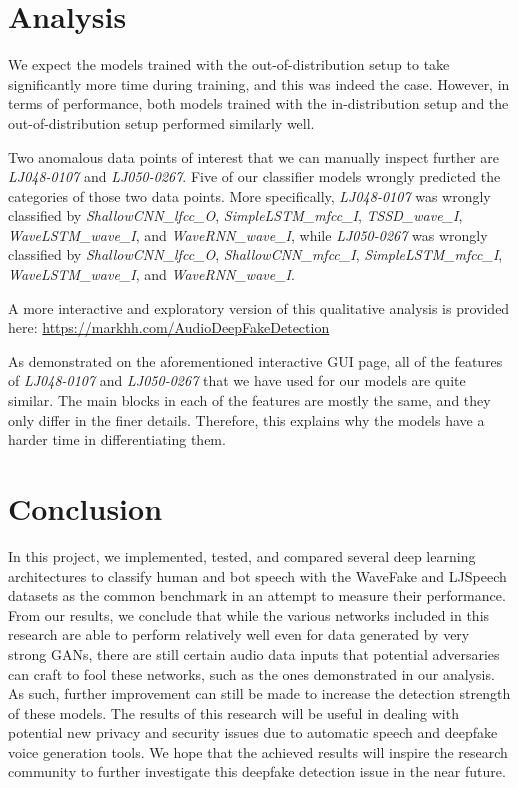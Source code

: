 \documentclass{article}
\begin{document}

\section{Analysis}
We expect the models trained with the out-of-distribution setup to take significantly more time during training, and this was indeed the case. However, in terms of performance, both models trained with the in-distribution setup and the out-of-distribution setup performed similarly well.

Two anomalous data points of interest that we can manually inspect further are \emph{LJ048-0107} and \emph{LJ050-0267}. Five of our classifier models wrongly predicted the categories of those two data points. More specifically, \emph{LJ048-0107} was wrongly classified by \emph{ShallowCNN\_lfcc\_O}, \emph{SimpleLSTM\_mfcc\_I}, \emph{TSSD\_wave\_I}, \emph{WaveLSTM\_wave\_I}, and \emph{WaveRNN\_wave\_I}, while \emph{LJ050-0267} was wrongly classified by \emph{ShallowCNN\_lfcc\_O}, \emph{ShallowCNN\_mfcc\_I}, \emph{SimpleLSTM\_mfcc\_I}, \emph{WaveLSTM\_wave\_I}, and \emph{WaveRNN\_wave\_I}.

A more interactive and exploratory version of this qualitative analysis is provided here: \url{https://markhh.com/AudioDeepFakeDetection}

As demonstrated on the aforementioned interactive GUI page, all of the features of \emph{LJ048-0107} and \emph{LJ050-0267} that we have used for our models are quite similar. The main blocks in each of the features are mostly the same, and they only differ in the finer details. Therefore, this explains why the models have a harder time in differentiating them.

\section{Conclusion}
In this project, we implemented, tested, and compared several deep learning architectures to classify human and bot speech with the WaveFake and LJSpeech datasets as the common benchmark in an attempt to measure their performance. From our results, we conclude that while the various networks included in this research are able to perform relatively well even for data generated by very strong GANs, there are still certain audio data inputs that potential adversaries can craft to fool these networks, such as the ones demonstrated in our analysis. As such, further improvement can still be made to increase the detection strength of these models. The results of this research will be useful in dealing with potential new privacy and security issues due to automatic speech and deepfake voice generation tools. We hope that the achieved results will inspire the research community to further investigate this deepfake detection issue in the near future.
\end{document}
